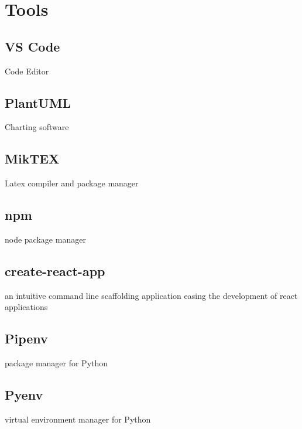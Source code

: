 \section{Tools}
\subsection{VS Code}
Code Editor
\subsection{PlantUML}
Charting software
\subsection{MikTEX}
Latex compiler and package manager
\subsection{npm}
node package manager
\subsection{create-react-app}
an intuitive command line scaffolding application easing the development of react applications
\subsection{Pipenv}
package manager for Python
\subsection{Pyenv}
virtual environment manager for Python